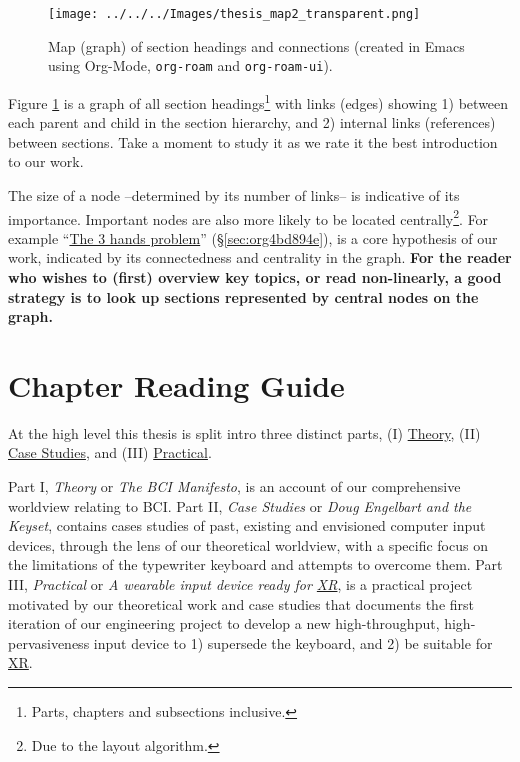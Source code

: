 \documentclass[logo,bsc,singlespacing,parskip]{infthesis}
\begin{document}
\begin{figure}[H]
\centering
\texttt{[image: ../../../Images/thesis\_map2\_transparent.png]}
\caption[Thesis map]{\label{fig:topic_map}Map (graph) of section headings and connections (created in Emacs using Org-Mode, \texttt{org-roam} and \texttt{org-roam-ui}).}
\end{figure}

Figure \ref{fig:topic_map} is a graph of all section headings\footnote{Parts, chapters and subsections inclusive.} with links (edges) showing 1) between each parent and child in the section hierarchy, and 2) internal links (references) between sections.
Take a moment to study it as we rate it the best introduction to our work.

The size of a node --determined by its number of links-- is indicative of its importance.
Important nodes are also more likely to be located centrally\footnote{Due to the layout algorithm.}.
For example ``\hyperref[sec:org4bd894e]{The 3 hands problem}'' (\S \ref{sec:org4bd894e}), is a core hypothesis of our work, indicated by its connectedness and centrality in the graph.
\textbf{For the reader who wishes to (first) overview key topics, or read non-linearly, a good strategy is to look up sections represented by central nodes on the graph.}

\chapter*{Chapter Reading Guide}
\label{sec:org11b36a2}
At the high level this thesis is split intro three distinct parts, (I) \hyperref[sec:orge0d2df2]{Theory}, (II) \hyperref[sec:orgb1f4c1e]{Case Studies}, and (III) \hyperref[sec:org5f92648]{Practical}.

Part I, \emph{Theory} or \emph{The BCI Manifesto}, is an account of our comprehensive worldview relating to BCI.
Part II, \emph{Case Studies} or \emph{Doug Engelbart and the Keyset}, contains cases studies of past, existing and envisioned computer input devices, through the lens of our theoretical worldview, with a specific focus on the limitations of the typewriter keyboard and attempts to overcome them.
Part III, \emph{Practical} or \emph{A wearable input device ready for \hyperref[org39cbd51]{XR}}, is a practical project motivated by our theoretical work and case studies that documents the first iteration of our engineering project to develop a new high-throughput, high-pervasiveness input device to 1) supersede the keyboard, and 2) be suitable for \hyperref[org39cbd51]{XR}.
\end{document}
